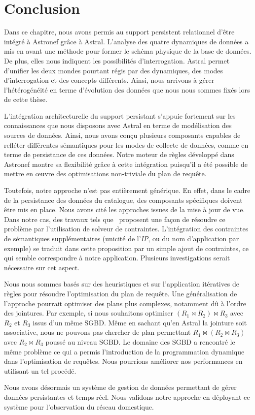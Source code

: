 \section{Conclusion}\label{sec:contrib:asteroid:conclusion}
Dans ce chapitre, nous avons permis au support persistent relationnel d'être intégré à Astronef grâce à Astral. L'analyse des quatre dynamiques de données a mis en avant une méthode pour former le schéma physique de la base de données. De plus, elles nous indiquent les possibilités d'interrogation. Astral permet d'unifier les deux mondes pourtant régis par des dynamiques, des modes d'interrogation et des concepts différents. Ainsi, nous arrivons à gérer l'hétérogénéité en terme d'évolution des données que nous nous sommes fixés lors de cette thèse.

L'intégration architecturelle du support persistant s'appuie fortement sur les connaissances que nous disposons avec Astral en terme de modélisation des sources de données. Ainsi, nous avons conçu plusieurs composants capables de refléter différentes sémantiques pour les modes de collecte de données, comme en terme de persistance de ces données. Notre moteur de règles développé dans Astronef montre sa flexibilité grâce à cette intégration puisqu'il a été possible de mettre en œuvre des optimisations non-triviale du plan de requête.

Toutefois, notre approche n'est pas entièrement générique. En effet, dans le cadre de la persistance des données du catalogue, des composants spécifiques doivent être mis en place. Nous avons cité les approches issues de la mise à jour de vue. Dans notre cas, des travaux tels que~\cite{Shu:viewupdate} proposent une façon de résoudre ce problème par l'utilisation de solveur de contraintes. L'intégration des contraintes de sémantiques supplémentaires (unicité de l'\textit{IP}, ou du nom d'application par exemple) se traduit dans cette proposition par un simple ajout de contraintes, ce qui semble correspondre à notre application. Plusieurs investigations serait nécessaire sur cet aspect.

Nous nous sommes basés sur des heuristiques et sur l'application itératives de règles pour résoudre l'optimisation du plan de requête. Une généralisation de l'approche pourrait optimiser des plans plus complexes, notamment dû à l'ordre des jointures. Par exemple, si nous souhaitons optimiser $(R_1 \Join R_2) \Join R_3$ avec $R_2$ et $R_3$ issus d'un même SGBD. Même en sachant qu'en Astral la jointure soit associative, nous ne pouvons pas chercher de plan permettant $R_1 \Join (R_2 \Join R_3)$ avec $R_2\Join R_3$ poussé au niveau SGBD. Le domaine des SGBD a rencontré le même problème ce qui a permis l'introduction de la programmation dynamique dans l'optimisation de requêtes. Nous pourrions améliorer nos performances en utilisant un tel procédé.

Nous avons désormais un système de gestion de données permettant de gérer données persistantes et temps-réel. Nous validons notre approche en déployant ce système pour l'observation du réseau domestique.